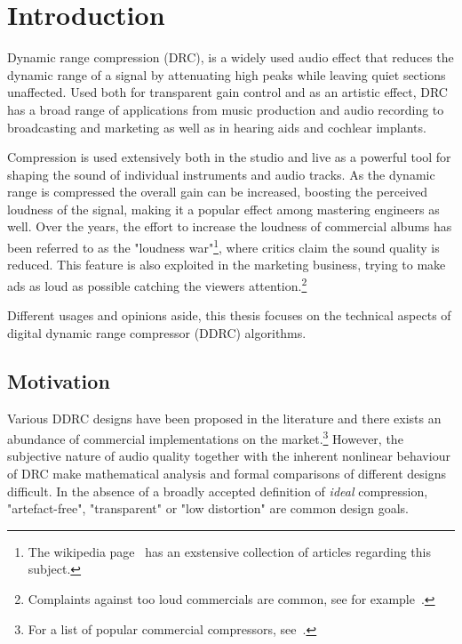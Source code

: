 \documentclass[../main2.tex]{subfiles}
\begin{document}
\section{Introduction}
Dynamic range compression (DRC), is a widely used audio effect that reduces the dynamic range of a signal by attenuating high peaks while leaving quiet sections unaffected. Used both for transparent gain control and as an artistic effect, DRC has a broad range of applications from music production and audio recording to broadcasting and marketing as well as in hearing aids and cochlear implants.

Compression is used extensively both in the studio and live as a powerful tool for shaping the sound of individual instruments and audio tracks. As the dynamic range is compressed the overall gain can be increased, boosting the perceived loudness of the signal, making it a popular effect among mastering engineers as well. Over the years, the effort to increase the loudness of commercial albums has been referred to as the "loudness war"\footnote{The wikipedia page~\cite{loudness_war} has an exstensive collection of articles regarding this subject.}, where critics claim the sound quality is reduced. This feature is also exploited in the marketing business, trying to make ads as loud as possible catching the viewers attention.\footnote{Complaints against too loud commercials are common, see for example~\cite{comp_ads}.} 

Different usages and opinions aside, this thesis focuses on the technical aspects of digital dynamic range compressor (DDRC) algorithms. 


\subsection{Motivation}
Various DDRC designs have been proposed in the literature and there exists an abundance of commercial implementations on the market.\footnote{For a list of popular commercial compressors, see~\cite{commercial}.} However, the subjective nature of audio quality together with the inherent nonlinear behaviour of DRC make mathematical analysis and formal comparisons of different designs difficult. In the absence of a broadly accepted definition of \emph{ideal} compression, "artefact-free", "transparent" or "low distortion" are common design goals.
\end{document}
